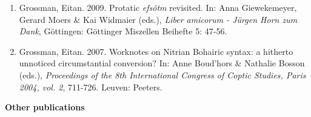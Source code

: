 \documentclass[letterpaper,11pt]{article}
\newcommand{\resheading}[1]{
\vspace*{6pt}
{\large \colorbox{mygrey}{\begin{minipage}{\textwidth}{\textbf{#1 \vphantom{p\^{E}}}}\end{minipage}}}
}
\begin{document}
\begin{enumerate}[resume]
\item Grossman, Eitan. 2009. Protatic \textit{efs\^otm} revisited. In: Anna Giewekemeyer, Gerard Moers \& Kai Widmaier (eds.), \textit {Liber amicorum - J\"urgen Horn zum Dank}, G\"ottingen: G\"ottinger Miszellen Beihefte 5: 47-56. 

\item Grossman, Eitan. 2007. Worknotes on Nitrian Bohairic syntax: a hitherto unnoticed circumstantial conversion? In: Anne Boud’hors \& Nathalie Bosson (eds.), \textit{Proceedings of the 8th International Congress of Coptic Studies, Paris 2004, vol. 2}, 711-726. Leuven: Peeters.















\end{enumerate}
\resheading{Other publications} 
\end{document}
